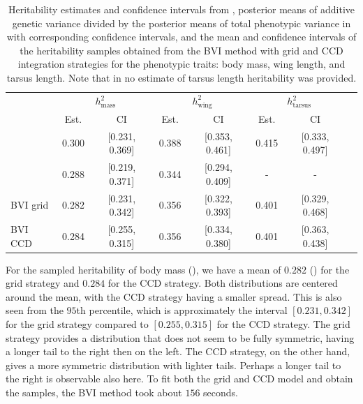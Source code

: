 \begin{table}[H]
  \centering
  \small
  \begin{tabular}{lccccccc}
    \toprule
    & \multicolumn{2}{c}{$h^2_{\text{mass}}$} & \multicolumn{2}{c}{$h^2_{\text{wing}}$} & \multicolumn{2}{c}{$h^2_{\text{tarsus}}$} \\
    \cmidrule(lr){2-3} \cmidrule(lr){4-5} \cmidrule(lr){6-7}
    & Est. & CI & Est. & CI & Est. & CI \\
    \midrule
    \citet{Silva2017} & 0.300 & [0.231, 0.369] & 0.388 & [0.353, 0.461] & 0.415 & [0.333, 0.497] \\
    \citet{Muff2019Genetic} & 0.288 & [0.219, 0.371] & 0.344 & [0.294, 0.409] & - & - \\
    BVI grid & 0.282 & [0.231, 0.342] & 0.356 & [0.322, 0.393] & 0.401 & [0.329, 0.468] \\
    BVI CCD & 0.284 & [0.255, 0.315] & 0.356 & [0.334, 0.380] & 0.401 & [0.363, 0.438] \\
    \bottomrule
  \end{tabular}
  \caption[Heritability estimates and confidence intervals]{Heritability estimates and confidence intervals from \citet{Silva2017}, posterior means of additive genetic variance divided by the posterior means of total phenotypic variance in \citet{Muff2019Genetic} with corresponding confidence intervals, and the mean and confidence intervals of the heritability samples obtained from the BVI method with grid and CCD integration strategies for the phenotypic traits: body mass, wing length, and tarsus length. Note that in \citet{Muff2019Genetic} no estimate of tarsus length heritability was provided.}
  \label{table:summary_heritability}
\end{table}
\noindent For the sampled heritability of body mass (), we have a mean of $0.282$ () for the grid strategy and $0.284$ for the CCD strategy. Both distributions are centered around the mean, with the CCD strategy having a smaller spread. This is also seen from the $95$th percentile, which is approximately the interval $[0.231, 0.342]$ for the grid strategy compared to $[0.255, 0.315]$ for the CCD strategy. The grid strategy provides a distribution that does not seem to be fully symmetric, having a longer tail to the right then on the left. The CCD strategy, on the other hand, gives a more symmetric distribution with lighter tails. Perhaps a longer tail to the right is observable also here. To fit both the grid and CCD model and obtain the samples, the BVI method took about $156$ seconds.
